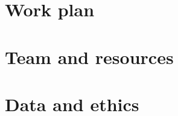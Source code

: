 \documentclass[11pt,a4paper]{article}
\begin{document}
\section{Work plan}
\par

\section{Team and resources}
\par

\section{Data and ethics}
\par



\end{document}

